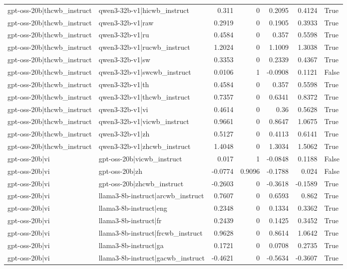 \begin{table}
\begin{tabular}{l l r r r r l}
gpt-oss-20b|thcwb_instruct & qwen3-32b-v1|hicwb_instruct & 0.311 & 0 & 0.2095 & 0.4124 & True \\
gpt-oss-20b|thcwb_instruct & qwen3-32b-v1|raw & 0.2919 & 0 & 0.1905 & 0.3933 & True \\
gpt-oss-20b|thcwb_instruct & qwen3-32b-v1|ru & 0.4584 & 0 & 0.357 & 0.5598 & True \\
gpt-oss-20b|thcwb_instruct & qwen3-32b-v1|rucwb_instruct & 1.2024 & 0 & 1.1009 & 1.3038 & True \\
gpt-oss-20b|thcwb_instruct & qwen3-32b-v1|sw & 0.3353 & 0 & 0.2339 & 0.4367 & True \\
gpt-oss-20b|thcwb_instruct & qwen3-32b-v1|swcwb_instruct & 0.0106 & 1 & -0.0908 & 0.1121 & False \\
gpt-oss-20b|thcwb_instruct & qwen3-32b-v1|th & 0.4584 & 0 & 0.357 & 0.5598 & True \\
gpt-oss-20b|thcwb_instruct & qwen3-32b-v1|thcwb_instruct & 0.7357 & 0 & 0.6341 & 0.8372 & True \\
gpt-oss-20b|thcwb_instruct & qwen3-32b-v1|vi & 0.4614 & 0 & 0.36 & 0.5628 & True \\
gpt-oss-20b|thcwb_instruct & qwen3-32b-v1|vicwb_instruct & 0.9661 & 0 & 0.8647 & 1.0675 & True \\
gpt-oss-20b|thcwb_instruct & qwen3-32b-v1|zh & 0.5127 & 0 & 0.4113 & 0.6141 & True \\
gpt-oss-20b|thcwb_instruct & qwen3-32b-v1|zhcwb_instruct & 1.4048 & 0 & 1.3034 & 1.5062 & True \\
gpt-oss-20b|vi & gpt-oss-20b|vicwb_instruct & 0.017 & 1 & -0.0848 & 0.1188 & False \\
gpt-oss-20b|vi & gpt-oss-20b|zh & -0.0774 & 0.9096 & -0.1788 & 0.024 & False \\
gpt-oss-20b|vi & gpt-oss-20b|zhcwb_instruct & -0.2603 & 0 & -0.3618 & -0.1589 & True \\
gpt-oss-20b|vi & llama3-8b-instruct|arcwb_instruct & 0.7607 & 0 & 0.6593 & 0.862 & True \\
gpt-oss-20b|vi & llama3-8b-instruct|eng & 0.2348 & 0 & 0.1334 & 0.3362 & True \\
gpt-oss-20b|vi & llama3-8b-instruct|fr & 0.2439 & 0 & 0.1425 & 0.3452 & True \\
gpt-oss-20b|vi & llama3-8b-instruct|frcwb_instruct & 0.9628 & 0 & 0.8614 & 1.0642 & True \\
gpt-oss-20b|vi & llama3-8b-instruct|ga & 0.1721 & 0 & 0.0708 & 0.2735 & True \\
gpt-oss-20b|vi & llama3-8b-instruct|gacwb_instruct & -0.4621 & 0 & -0.5634 & -0.3607 & True \\

\end{tabular}
\end{table}
